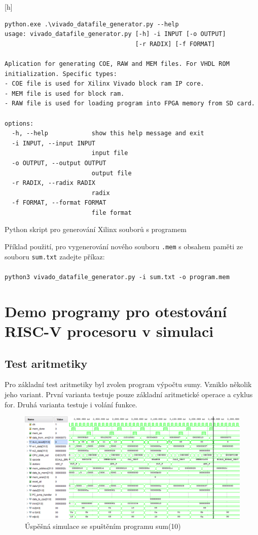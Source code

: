 \documentclass[FM,BP]{tulthesis}
\newenvironment{myquote}{\begin{list}{}{\setlength\leftmargin\parindent}\item[]}{\end{list}}
\newenvironment{listing}{\begin{myquote}\color{\tulcolor}}{\end{myquote}}
\begin{document}
\begin{listing}[h]
    \begin{verbatim}
python.exe .\vivado_datafile_generator.py --help
usage: vivado_datafile_generator.py [-h] -i INPUT [-o OUTPUT] 
                                    [-r RADIX] [-f FORMAT]    

Aplication for generating COE, RAW and MEM files. For VHDL ROM
initialization. Specific types: 
- COE file is used for Xilinx Vivado block ram IP core. 
- MEM file is used for block ram. 
- RAW file is used for loading program into FPGA memory from SD card.

options:
  -h, --help            show this help message and exit       
  -i INPUT, --input INPUT
                        input file
  -o OUTPUT, --output OUTPUT
                        output file
  -r RADIX, --radix RADIX
                        radix
  -f FORMAT, --format FORMAT
                        file format
    \end{verbatim}
    \caption{Python skript pro generování Xilinx souborů s programem}
    \label{listing:python_program}
\end{listing}

Příklad použití, pro vygenerování nového souboru \verb|.mem| s obsahem paměti ze souboru \verb|sum.txt| zadejte příkaz:

\paragraph{}
\verb|python3 vivado_datafile_generator.py -i sum.txt -o program.mem|

\section{Demo programy pro otestování RISC-V procesoru v simulaci}

\subsection{Test aritmetiky}
Pro základní test aritmetiky byl zvolen program výpočtu sumy. Vzniklo několik jeho variant. První varianta testuje pouze základní aritmetické operace a cyklus for. Druhá varianta testuje i volání funkce.

\begin{figure}[h]
    \centering
    \includegraphics[width=\textwidth]{assets/Program_sum(10).png}
    \caption{Úspěšná simulace se spuštěním programu sum(10)}
    \label{img:sum_simulace}
\end{figure}
\end{document}
